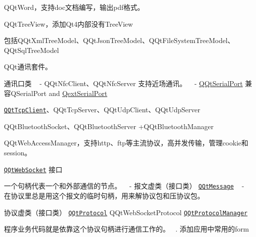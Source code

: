 \begin{DoxyEnumerate}
\item Q\+Qt\+Word，支持doc文档编写，输出pdf格式。
\item Q\+Qt\+Tree\+View，添加\+Qt4内部没有\+Tree\+View
\begin{DoxyItemize}
\item 包括\+Q\+Qt\+Xml\+Tree\+Model、\+Q\+Qt\+Json\+Tree\+Model、\+Q\+Qt\+File\+System\+Tree\+Model、\+Q\+Qt\+Sql\+Tree\+Model
\end{DoxyItemize}
\item Q\+Qt通讯套件。
\begin{DoxyItemize}
\item 通讯口类 ~\newline
 -\/ Q\+Qt\+Nfc\+Client、\+Q\+Qt\+Nfc\+Server 支持近场通讯。 ~\newline
 -\/ \mbox{\hyperlink{class_q_qt_serial_port}{Q\+Qt\+Serial\+Port}} 兼容\+Q\+Serial\+Port and \mbox{\hyperlink{class_qext_serial_port}{Qext\+Serial\+Port}}
\begin{DoxyItemize}
\item \href{src/network/qqttcpclient.h}{\tt Q\+Qt\+Tcp\+Client}、\+Q\+Qt\+Tcp\+Server、\+Q\+Qt\+Udp\+Client、\+Q\+Qt\+Udp\+Server
\item Q\+Qt\+Bluetooth\+Socket、\+Q\+Qt\+Bluetooth\+Server +\+Q\+Qt\+Bluetooth\+Manager
\item Q\+Qt\+Web\+Access\+Manager，支持http、ftp等主流协议，高并发传输，管理cookie和session。
\item \href{src/network/qqtwebsocketclient.h}{\tt Q\+Qt\+Web\+Socket} 接口
\item 一个句柄代表一个和外部通信的节点。 ~\newline
 -\/ 报文虚类（接口类） \href{src/network/qqtmessage.h}{\tt Q\+Qt\+Message} ~\newline
 -\/ 在协议里总是用这个报文的临时句柄，用来解协议包和压协议包。
\end{DoxyItemize}
\item 协议虚类（接口类） \href{src/network/qqtprotocol.h}{\tt Q\+Qt\+Protocol} Q\+Qt\+Web\+Socket\+Protocol \href{src/network/qqtprotocolmanager.h}{\tt Q\+Qt\+Protocol\+Manager}
\begin{DoxyItemize}
\item 程序业务代码就是依靠这个协议句柄进行通信工作的。 ~. 添加应用中常用的form
\end{DoxyItemize}
\end{DoxyItemize}
\end{DoxyEnumerate}

